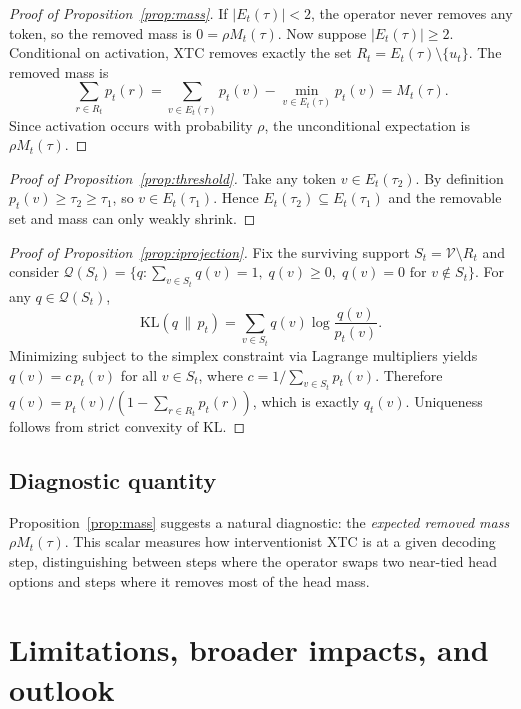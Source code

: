 \documentclass{article}
\newcommand{\xtc}{\textsc{XTC}}
\newcommand{\Vocab}{\mathcal{V}}
\newcommand{\pt}{p_t}
\newcommand{\qt}{q_t}
\newcommand{\Et}{E_t(\tau)}
\newcommand{\Rt}{R_t}
\begin{document}
\begin{proof}[Proof of Proposition~\ref{prop:mass}]
If $|\Et| < 2$, the operator never removes any token, so the removed mass is $0 = \rho M_t(\tau)$.
Now suppose $|\Et| \ge 2$.
Conditional on activation, \xtc{} removes exactly the set $\Rt = \Et \setminus \{u_t\}$.
The removed mass is
\[
\sum_{r \in \Rt}\pt(r) = \sum_{v \in \Et}\pt(v) - \min_{v \in \Et}\pt(v) = M_t(\tau).
\]
Since activation occurs with probability $\rho$, the unconditional expectation is $\rho M_t(\tau)$.
\end{proof}

\begin{proof}[Proof of Proposition~\ref{prop:threshold}]
Take any token $v \in E_t(\tau_2)$.
By definition $\pt(v) \ge \tau_2 \ge \tau_1$, so $v \in E_t(\tau_1)$.
Hence $E_t(\tau_2) \subseteq E_t(\tau_1)$ and the removable set and mass can only weakly shrink.
\end{proof}

\begin{proof}[Proof of Proposition~\ref{prop:iprojection}]
Fix the surviving support $S_t = \Vocab \setminus \Rt$ and consider
$\mathcal{Q}(S_t) = \{ q : \sum_{v \in S_t} q(v) = 1,\; q(v) \ge 0,\; q(v)=0 \text{ for } v \notin S_t \}$.
For any $q \in \mathcal{Q}(S_t)$,
\[
\mathrm{KL}(q \,\|\, \pt) = \sum_{v \in S_t} q(v)\log \frac{q(v)}{\pt(v)}.
\]
Minimizing subject to the simplex constraint via Lagrange multipliers yields $q(v) = c \, \pt(v)$ for all $v \in S_t$, where $c = 1/\sum_{v \in S_t} \pt(v)$.
Therefore $q(v) = \pt(v)/(1 - \sum_{r \in \Rt}\pt(r))$, which is exactly $\qt(v)$.
Uniqueness follows from strict convexity of $\mathrm{KL}$.
\end{proof}

\subsection{Diagnostic quantity}

Proposition~\ref{prop:mass} suggests a natural diagnostic: the \emph{expected removed mass} $\rho M_t(\tau)$.
This scalar measures how interventionist \xtc{} is at a given decoding step, distinguishing between steps where the operator swaps two near-tied head options and steps where it removes most of the head mass.
\FloatBarrier

\section{Limitations, broader impacts, and outlook}
\label{sec:discussion}
\end{document}
